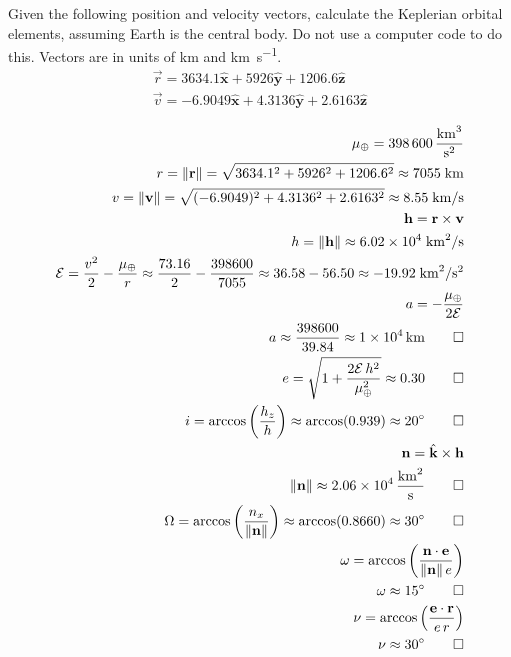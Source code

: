 \begin{hwkProblem}{1}{}

	Given the following position and velocity vectors, calculate the Keplerian orbital elements, assuming Earth is the central body. Do not use a computer code to do this. Vectors are in units of \unit{\km} and \unit{\km\per\s}.
	\begin{align*}
		\vec{r} = 3634.1 \bm{\hat{x}} + 5926 \bm{\hat{y}} + 1206.6 \bm{\hat{z}} \\
		\vec{v} = -6.9049 \bm{\hat{x}} + 4.3136 \bm{\hat{y}} + 2.6163 \bm{\hat{z}}
	\end{align*}

	\hwkSol

	\begin{align*}
		\mu_\oplus = \qty{398600}{\cubic\km\per\square\s} \\
		r = \|\mathbf{r}\| = \sqrt{3634.1^2 + 5926^2 + 1206.6^2} \approx 7055\;\mathrm{km}\\
		v = \|\mathbf{v}\| = \sqrt{(-6.9049)^2 + 4.3136^2 + 2.6163^2} \approx 8.55\;\mathrm{km/s} \\
		\mathbf{h} = \mathbf{r} \times \mathbf{v} \\
		h = \|\mathbf{h}\| \approx 6.02\times10^4\;\mathrm{km}^2/\mathrm{s} \\
		\mathcal{E} = \frac{v^2}{2} - \frac{\mu_\oplus}{r} \approx \frac{73.16}{2} - \frac{398600}{7055} \approx 36.58 - 56.50 \approx -19.92\;\mathrm{km}^2/\mathrm{s}^2 \\
		a = -\frac{\mu_\oplus}{2\mathcal{E}} \\
		a \approx \frac{398600}{39.84} \approx \qty{1e4}{\km} \qed \\
		e = \sqrt{1 + \frac{2\mathcal{E}\,h^2}{\mu_\oplus^2}} \approx 0.30 \qed \\
		i = \arccos\left(\frac{h_z}{h}\right) \approx \arccos(0.939) \approx \qty{20}{\degree} \qed \\
		\mathbf{n} = \hat{\mathbf{k}} \times \mathbf{h} \\
		\|\mathbf{n}\| \approx \qty{2.06e4}{\square\km\per\s} \qed \\
		\Omega = \arccos\left(\frac{n_x}{\|\mathbf{n}\|}\right) \approx \arccos(0.8660) \approx \qty{30}{\degree} \qed \\
		\omega = \arccos\left(\frac{\mathbf{n}\cdot\mathbf{e}}{\|\mathbf{n}\|\,e}\right) \\
		\omega \approx \qty{15}{\degree} \qed \\
		\nu = \arccos\left(\frac{\mathbf{e}\cdot\mathbf{r}}{e\,r}\right) \\
		\nu \approx \qty{30}{\degree} \qed \\
	\end{align*}


\end{hwkProblem}
